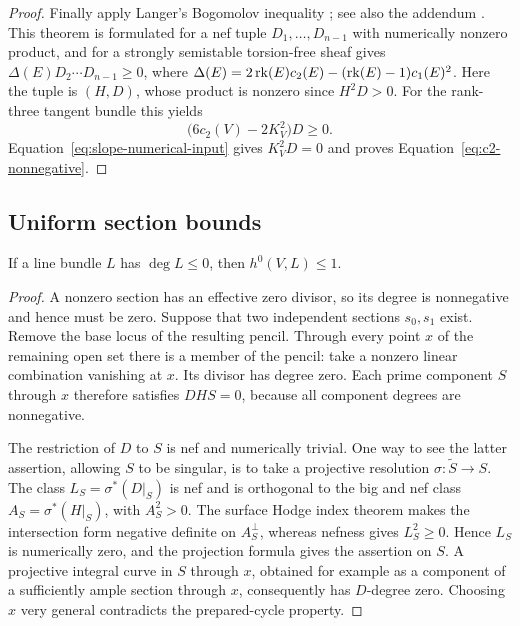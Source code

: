 \begin{proof}
Finally apply Langer's Bogomolov inequality
\cite[Theorem~3.2]{langer2004}; see also the addendum
\cite{langeradd2004}.  This theorem is formulated for a nef tuple
$D_1,\ldots,D_{n-1}$ with numerically nonzero product, and for a strongly
semistable torsion-free sheaf gives
$\Delta(E)D_2\cdots D_{n-1}\ge0$, where
$\Delta(E)=2\operatorname{rk}(E)c_2(E)-(\operatorname{rk}(E)-1)c_1(E)^2$.
Here the tuple is $(H,D)$, whose product is nonzero since $H^2D>0$.
For the rank-three tangent bundle this yields
\[
  \bigl(6c_2(V)-2K_V^2\bigr)D\ge0.
\]
Equation~\eqref{eq:slope-numerical-input} gives $K_V^2D=0$ and proves
Equation~\eqref{eq:c2-nonnegative}.
\end{proof}

\subsection{Uniform section bounds}

\begin{lemma}
\label{lem:degree-zero-line-sections}
If a line bundle $L$ has $\deg L\le0$, then $h^0(V,L)\le1$.
\end{lemma}

\begin{proof}
A nonzero section has an effective zero divisor, so its degree is
nonnegative and hence must be zero.  Suppose that two independent
sections $s_0,s_1$ exist.  Remove the base locus of the resulting pencil.
Through every point $x$ of the remaining open set there is a member of
the pencil: take a nonzero linear combination vanishing at $x$.  Its
divisor has degree zero.  Each prime component $S$ through $x$ therefore
satisfies $DHS=0$, because all component degrees are nonnegative.

The restriction of $D$ to $S$ is nef and numerically trivial.  One way
to see the latter assertion, allowing $S$ to be singular, is to take a
projective resolution $\sigma\colon\widetilde S\to S$.  The class
$L_S=\sigma^*(D|_S)$ is nef and is orthogonal to the big and nef class
$A_S=\sigma^*(H|_S)$, with $A_S^2>0$.  The surface Hodge index theorem
\cite[Chapter~V, Section~1]{hartshorne1977}
makes the intersection form negative definite on $A_S^\perp$, whereas
nefness gives $L_S^2\ge0$.  Hence $L_S$ is numerically zero, and the
projection formula gives the assertion on $S$.  A projective integral
curve in $S$ through $x$, obtained for example as a component of a
sufficiently ample section through $x$, consequently has $D$-degree zero.
Choosing $x$ very general contradicts the prepared-cycle property.
\end{proof}

